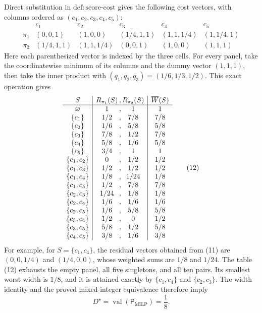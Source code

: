 Direct substitution in \(\mathrm{def{:}score\text{-}cost}\) gives the
following cost vectors, with columns ordered as
\((c_1,c_2,c_3,c_4,c_5)\):
\[
\begin{array}{c|ccccc}
&c_1&c_2&c_3&c_4&c_5\\ \hline
\pi_1&(0,0,1)&(1,0,0)&(1/4,1,1)&(1,1,1/4)&(1,1/4,1)\\
\pi_2&(1/4,1,1)&(1,1,1/4)&(0,0,1)&(1,0,0)&(1,1,1)
\end{array}                                                            \tag{11}
\]
Here each parenthesized vector is indexed by the three cells.  For every
panel, take the coordinatewise minimum of its columns and the dummy vector
\((1,1,1)\), then take the inner product with
\((q_1,q_2,q_3)=(1/6,1/3,1/2)\).  This exact operation gives
\[
\begin{array}{c|c@{\,,\,}c|c}
S&R_{\pi_1}(S)&R_{\pi_2}(S)&\overline W(S)\\ \hline
\varnothing&1&1&1\\
\{c_1\}&1/2&7/8&7/8\\
\{c_2\}&1/6&5/8&5/8\\
\{c_3\}&7/8&1/2&7/8\\
\{c_4\}&5/8&1/6&5/8\\
\{c_5\}&3/4&1&1\\
\{c_1,c_2\}&0&1/2&1/2\\
\{c_1,c_3\}&1/2&1/2&1/2\\
\{c_1,c_4\}&1/8&1/24&1/8\\
\{c_1,c_5\}&1/2&7/8&7/8\\
\{c_2,c_3\}&1/24&1/8&1/8\\
\{c_2,c_4\}&1/6&1/6&1/6\\
\{c_2,c_5\}&1/6&5/8&5/8\\
\{c_3,c_4\}&1/2&0&1/2\\
\{c_3,c_5\}&5/8&1/2&5/8\\
\{c_4,c_5\}&3/8&1/6&3/8
\end{array}                                                            \tag{12}
\]
For example, for \(S=\{c_1,c_4\}\), the residual vectors obtained from
(11) are \((0,0,1/4)\) and \((1/4,0,0)\), whose weighted sums are
\(1/8\) and \(1/24\).  The table (12) exhausts the empty panel, all five
singletons, and all ten pairs.  Its smallest worst width is \(1/8\), and
it is attained exactly by \(\{c_1,c_4\}\) and
\(\{c_2,c_3\}\).  The width identity and the proved mixed-integer
equivalence therefore imply
\[
D^\star=\operatorname{val}(\mathsf P_{\mathrm{MILP}})=\frac18.         \tag{13}
\]

